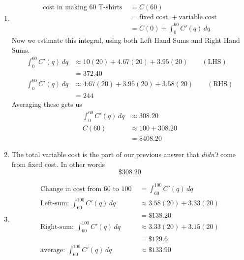 \documentclass[oneside]{book}
\theoremstyle{definition}
\theoremstyle{solution}
\newtheorem*{solution}{Solution}
\newenvironment{solution}{\vspace{2in}\comment}{\endcomment}
\begin{document}
\begin{solution}
  \begin{enumerate}
  \item
    \begin{align*}
      \text{ cost in making 60 T-shirts } 
      & = C(60)\\
      & = \text{fixed cost } + \text{variable cost }\\
      & = C(0) + \int_0^{60} C'(q)\,dq
    \end{align*}
    Now we estimate this integral, using both Left Hand Sums and Right
    Hand Sums.
    \begin{align*}
      \int_0 ^{60}C'(q)\,dq 
      & \approx 10 (20) + 4.67(20) + 3.95(20)  \qquad (\text{LHS})\\
      & = 372.40\\
      \int_0^{60} C'(q)\,dq 
      & \approx 4.67(20) + 3.95(20) + 3.58(20)  \qquad (\text{RHS})\\
      & = 244
     \end{align*}
     Averaging these gets us
     \begin{align*}
       \int_0^{60} C'(q)\,dq & \approx 308.20       \\
       C(60)                 & \approx 100 + 308.20 \\
                             & = \$408.20
     \end{align*}

   \item The total variable cost is the part of our previous answer
     that \textit{didn't} come from fixed cost. In other words
     $$ 
     \$308.20
     $$

   \item
     \begin{align*}
       \text{Change in cost from 60 to 100 }       & = \int_{60}^{100} C'(q)\,dq \\
       \text{Left-sum: }  \int_{60}^{100} C'(q)\,dq  & \approx 3.58(20) + 3.33(20) \\
                                                   & = \$138.20                  \\
       \text{Right-sum: }  \int_{60}^{100} C'(q)\,dq & \approx 3.33(20) + 3.15(20) \\
                                                   & = \$ 129.6                  \\
       \text{average: } \int_{60}^{100} C'(q)\,dq    & \approx \$133.90
     \end{align*}
   \end{enumerate}
 \end{solution}
\end{document}
